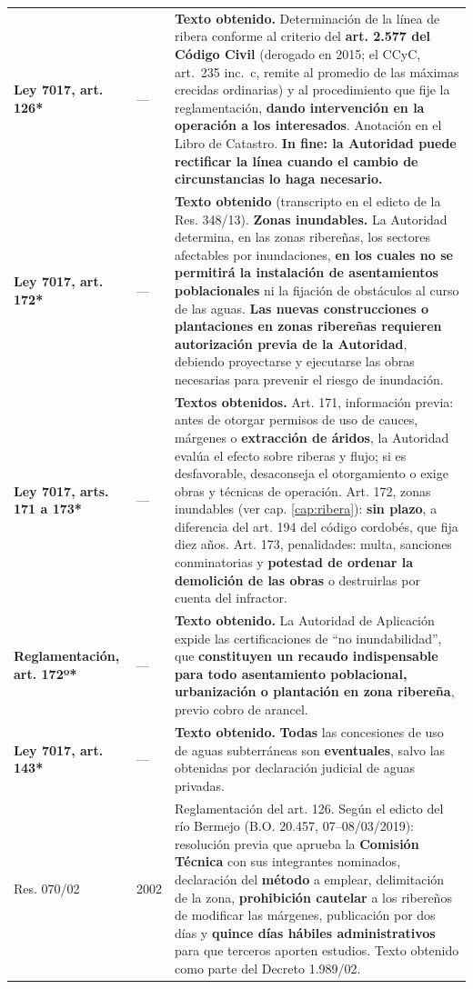 \begin{longtable}{@{}p{3.2cm}p{1.9cm}p{7.9cm}@{}}
\textbf{Ley 7017, art. 126*} & --- & \textbf{Texto obtenido.} Determinación de la línea de ribera conforme al criterio del \textbf{art. 2.577 del Código Civil} (derogado en 2015; el CCyC, art.\ 235 inc.\ c, remite al promedio de las máximas crecidas ordinarias) y al procedimiento que fije la reglamentación, \textbf{dando intervención en la operación a los interesados}. Anotación en el Libro de Catastro. \textbf{In fine: la Autoridad puede rectificar la línea cuando el cambio de circunstancias lo haga necesario.} \\
\textbf{Ley 7017, art. 172*} & --- & \textbf{Texto obtenido} (transcripto en el edicto de la Res. 348/13). \textbf{Zonas inundables.} La Autoridad determina, en las zonas ribereñas, los sectores afectables por inundaciones, \textbf{en los cuales no se permitirá la instalación de asentamientos poblacionales} ni la fijación de obstáculos al curso de las aguas. \textbf{Las nuevas construcciones o plantaciones en zonas ribereñas requieren autorización previa de la Autoridad}, debiendo proyectarse y ejecutarse las obras necesarias para prevenir el riesgo de inundación. \\
\textbf{Ley 7017, arts. 171 a 173*} & --- & \textbf{Textos obtenidos.} Art. 171, información previa: antes de otorgar permisos de uso de cauces, márgenes o \textbf{extracción de áridos}, la Autoridad evalúa el efecto sobre riberas y flujo; si es desfavorable, desaconseja el otorgamiento o exige obras y técnicas de operación. Art. 172, zonas inundables (ver cap. \ref{cap:ribera}): \textbf{sin plazo}, a diferencia del art. 194 del código cordobés, que fija diez años. Art. 173, penalidades: multa, sanciones conminatorias y \textbf{potestad de ordenar la demolición de las obras} o destruirlas por cuenta del infractor. \\
\textbf{Reglamentación, art. 172º*} & --- & \textbf{Texto obtenido.} La Autoridad de Aplicación expide las certificaciones de ``no inundabilidad'', que \textbf{constituyen un recaudo indispensable para todo asentamiento poblacional, urbanización o plantación en zona ribereña}, previo cobro de arancel. \\
\textbf{Ley 7017, art. 143*} & --- & \textbf{Texto obtenido.} \textbf{Todas} las concesiones de uso de aguas subterráneas son \textbf{eventuales}, salvo las obtenidas por declaración judicial de aguas privadas. \\
Res. 070/02 & 2002 & Reglamentación del art. 126. Según el edicto del río Bermejo (B.O. 20.457, 07--08/03/2019): resolución previa que aprueba la \textbf{Comisión Técnica} con sus integrantes nominados, declaración del \textbf{método} a emplear, delimitación de la zona, \textbf{prohibición cautelar} a los ribereños de modificar las márgenes, publicación por dos días y \textbf{quince días hábiles administrativos} para que terceros aporten estudios. Texto obtenido como parte del Decreto 1.989/02.\\
\bottomrule
\end{longtable}


